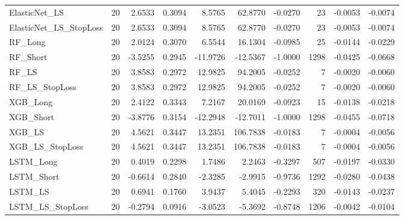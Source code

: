 \begin{tabular}{llrrrrrrrr}
\cline{1-10}
ElasticNet\_LS & 20 & 2.6533 & 0.3094 & 8.5765 & 62.8770 & -0.0270 & 23 & -0.0053 & -0.0074 \\
\cline{1-10}
ElasticNet\_LS\_StopLoss & 20 & 2.6533 & 0.3094 & 8.5765 & 62.8770 & -0.0270 & 23 & -0.0053 & -0.0074 \\
\cline{1-10}
RF\_Long & 20 & 2.0124 & 0.3070 & 6.5544 & 16.1304 & -0.0985 & 25 & -0.0144 & -0.0229 \\
\cline{1-10}
RF\_Short & 20 & -3.5255 & 0.2945 & -11.9726 & -12.5367 & -1.0000 & 1298 & -0.0425 & -0.0668 \\
\cline{1-10}
RF\_LS & 20 & 3.8583 & 0.2972 & 12.9825 & 94.2005 & -0.0252 & 7 & -0.0020 & -0.0060 \\
\cline{1-10}
RF\_LS\_StopLoss & 20 & 3.8583 & 0.2972 & 12.9825 & 94.2005 & -0.0252 & 7 & -0.0020 & -0.0060 \\
\cline{1-10}
XGB\_Long & 20 & 2.4122 & 0.3343 & 7.2167 & 20.0169 & -0.0923 & 15 & -0.0138 & -0.0218 \\
\cline{1-10}
XGB\_Short & 20 & -3.8776 & 0.3154 & -12.2948 & -12.7011 & -1.0000 & 1298 & -0.0455 & -0.0718 \\
\cline{1-10}
XGB\_LS & 20 & 4.5621 & 0.3447 & 13.2351 & 106.7838 & -0.0183 & 7 & -0.0004 & -0.0056 \\
\cline{1-10}
XGB\_LS\_StopLoss & 20 & 4.5621 & 0.3447 & 13.2351 & 106.7838 & -0.0183 & 7 & -0.0004 & -0.0056 \\
\cline{1-10}
LSTM\_Long & 20 & 0.4019 & 0.2298 & 1.7486 & 2.2463 & -0.3297 & 507 & -0.0197 & -0.0330 \\
\cline{1-10}
LSTM\_Short & 20 & -0.6614 & 0.2840 & -2.3285 & -2.9915 & -0.9736 & 1292 & -0.0280 & -0.0438 \\
\cline{1-10}
LSTM\_LS & 20 & 0.6941 & 0.1760 & 3.9437 & 5.4045 & -0.2293 & 320 & -0.0143 & -0.0237 \\
\cline{1-10}
LSTM\_LS\_StopLoss & 20 & -0.2794 & 0.0916 & -3.0523 & -5.3692 & -0.8748 & 1206 & -0.0042 & -0.0104 \\
\cline{1-10}
\bottomrule
\end{tabular}
